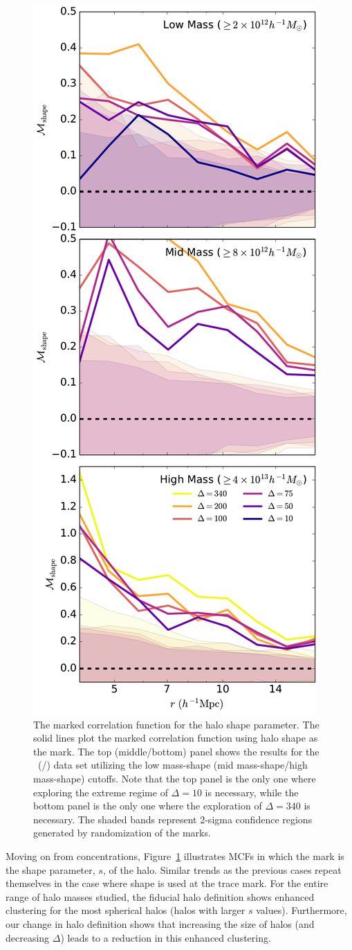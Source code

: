 \documentclass[usenatbib]{mnras}
\begin{document}
\begin{figure}
	\centering
	\includegraphics[width=.4\textwidth]{all_mcf_shape.pdf}
	\caption{
The marked correlation function for the halo shape parameter. The solid lines plot the marked correlation function using halo shape as the mark. The top (middle/bottom) panel shows the results for the
\simA \ (\simB /\simC) data set utilizing the low mass-shape (mid mass-shape/high mass-shape) cutoffs. Note
that the top panel is the only one where exploring the extreme regime of $\Delta = 10$ is
necessary, while the bottom panel is the only one where the exploration of $\Delta = 340$
is necessary. The shaded bands represent 2-sigma confidence regions generated by randomization of the marks.}
	\label{fig:cc_mcf_s}
\end{figure}

Moving on from concentrations, Figure~\ref{fig:cc_mcf_s} illustrates MCFs in which the mark is the shape
parameter, $s$, of the halo. Similar trends as the previous cases repeat themselves in the case where
shape is used at the trace mark. For the entire range of halo masses studied, the fiducial halo definition
shows enhanced clustering for the most spherical halos (halos with larger $s$ values). Furthermore,
our change in halo definition shows that increasing the size of halos (and decreasing $\Delta$) leads
to a reduction in this enhanced clustering.
\end{document}
